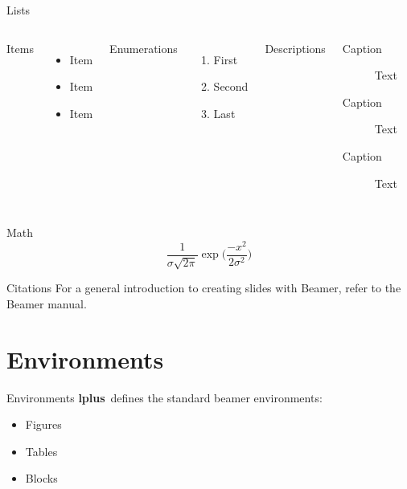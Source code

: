 \documentclass[aspectratio=169,colorblocks,darkmode]{beamer}
\newcommand{\themename}{\textbf{lplus}~}
\begin{document}
\begin{frame}{Lists}
  \begin{columns}[T,onlytextwidth]
      Items
      \begin{itemize}
        \item Item \item Item \item Item
      \end{itemize}

      Enumerations
      \begin{enumerate}
        \item First \item Second  \item Last
      \end{enumerate}

      Descriptions
      \begin{description}
        \item[Caption] Text 
        \item[Caption] Text
        \item[Caption] Text
      \end{description}
  \end{columns}
\end{frame}

\begin{frame}{Math}
  \begin{equation*}
    \frac{1}{\sigma\sqrt{2\pi}}\exp\biggl(\frac{-x^2}{2\sigma^2}\biggr)
  \end{equation*}
\end{frame}

\begin{frame}[fragile]{Citations}
For a general introduction to creating slides with Beamer, refer to the Beamer manual.\cite{BeamerManual}
\end{frame}


\section{Environments}
\begin{frame}{Environments}
\themename defines the standard beamer environments:
\begin{itemize}
    \item Figures
    \item Tables
    \item Blocks
\end{itemize}
\end{frame}
\end{document}
